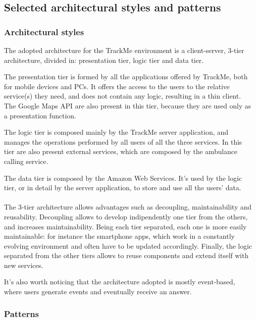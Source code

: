 \newpage
{\color{bluesec}\subsection{Selected architectural styles and patterns}}

{\color{bluesec}\subsubsection{Architectural styles}}
The adopted architecture for the TrackMe environment is a client-server, 3-tier architecture, divided in: presentation tier, logic tier and data tier.

The presentation tier is formed by all the applications offered by TrackMe, both for mobile devices and PCs. It offers the access to the users to the relative service(s) they need, and does not contain any logic, resulting in a thin client. The Google Maps API are also present in this tier, because they are used only as a presentation function.

The logic tier is composed mainly by the TrackMe server application, and manages the operations performed by all users of all the three services. In this tier are also present external services, which are composed by the ambulance calling service.

The data tier is composed by the Amazon Web Services. It's used by the logic tier, or in detail by the server application, to store and use all the users' data.

\paragraph{}The 3-tier architecture allows advantages such as decoupling, maintainability and reusability. Decoupling allows to develop indipendently one tier from the others, and increases maintainability. Being each tier separated, each one is more easily maintainable: for instance the smartphone apps, which work in a constantly evolving environment and often have to be updated accordingly. Finally, the logic separated from the other tiers allows to reuse components and extend itself with new services.

It's also worth noticing that the architecture adopted is mostly event-based, where users generate events and eventually receive an answer.

{\color{bluesec}\subsubsection{Patterns}}
